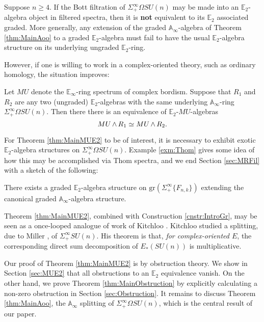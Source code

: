 \begin{thm} \label{thm:MainObstruction}
Suppose $n \ge 4$.  If the Bott filtration of $\Sigma^{\infty}_+ \Omega SU(n)$ may be made into an $\mathbb{E}_2$-algebra object in filtered spectra, then it is \textbf{not} equivalent to its $\mathbb{E}_2$ associated graded.  More generally, any extension of the graded $\mathbb{A}_\infty$-algebra of Theorem \ref{thm:MainAoo} to a graded $\mathbb{E}_2$-algebra must fail to have the usual $\mathbb{E}_2$-algebra structure on its underlying ungraded $\mathbb{E}_2$-ring.
\end{thm}

However, if one is willing to work in a complex-oriented theory, such as ordinary homology, the situation improves:

\begin{thm} \label{thm:MainMUE2}
Let $MU$ denote the $\mathbb{E}_\infty$-ring spectrum of complex bordism.  Suppose that $R_1$ and $R_2$ are any two (ungraded) $\mathbb{E}_2$-algebras with the same underlying $\mathbb{A}_\infty$-ring $\Sigma^{\infty}_+ \Omega SU(n)$.  Then there there is an equivalence of $\mathbb{E}_2$-$MU$-algebras
$$MU \operatorname{\wedge} R_1 \simeq MU \operatorname{\wedge} R_2.$$
\end{thm}

For Theorem \ref{thm:MainMUE2} to be of interest, it is necessary to exhibit exotic $\mathbb{E}_2$-algebra structures on $\Sigma^{\infty}_+ \Omega SU(n)$.  Example \ref{exm:Thom} gives some idea of how this may be accomplished via Thom spectra, and we end Section \ref{sec:MRFil} with a sketch of the following:

\begin{cnstr} \label{cnstr:IntroGr}
There exists a graded $\mathbb{E}_2$-algebra structure on $\text{gr}(\Sigma^{\infty}_+ \{F_{n,k}\})$ extending the canonical graded $\mathbb{A}_\infty$-algebra structure.
\end{cnstr}

\begin{rmk}
Theorem \ref{thm:MainMUE2}, combined with Construction \ref{cnstr:IntroGr}, may be seen as a once-looped analogue of work of Kitchloo \cite{Kitchloo}.   Kitchloo studied a splitting, due to Miller \cite{MillerSplitting}, of $\Sigma^{\infty}_+ SU(n)$.  His theorem is that, \textit{for complex-oriented $E$}, the corresponding direct sum decomposition of $E_*(SU(n))$ is multiplicative.
\end{rmk}

Our proof of Theorem \ref{thm:MainMUE2} is by obstruction theory.  We show in Section \ref{sec:MUE2} that all obstructions to an $\mathbb{E}_2$ equivalence vanish.  On the other hand, we prove Theorem \ref{thm:MainObstruction} by explicitly calculating a non-zero obstruction in Section \ref{sec:Obstruction}.  It remains to discuss Theorem \ref{thm:MainAoo}, the $\mathbb{A}_\infty$ splitting of $\Sigma^{\infty}_+ \Omega SU(n)$, which is the central result of our paper.

